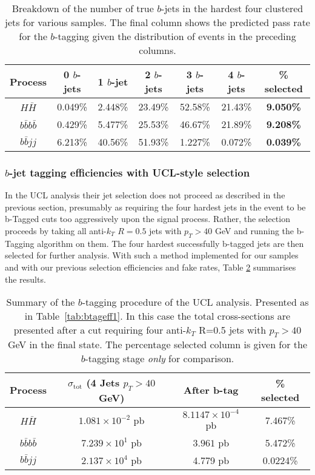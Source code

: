 \documentclass[12pt]{article}
\begin{document}
\begin{table}[htdp]
\begin{center}
\begin{tabular}{|c|c|c|c|c|c||c|}
\hline
Process & 0 $b$-jets & 1 $b$-jet & 2 $b$-jets & 3 $b$-jets & 4 $b$-jets & \% selected \\
\hline\hline
$H\bar{H}$ & 0.049\% &  2.448\% &  23.49\% & 52.58\% &  21.43\% & \textbf{9.050\%}\\
\hline
$b\bar{b}b\bar{b}$ & 0.429\% & 5.477\%   & 25.53\% & 46.67\%  &  21.89\% & \textbf{9.208\%} \\
$b\bar{b}jj$ & 6.213\%  &40.56\%  &51.93\%  &  1.227\% & 0.072\% & \textbf{0.039\%}\\
\hline
\end{tabular}
\end{center}
\caption{Breakdown of the number of true $b$-jets in the hardest four clustered jets for various samples. The final column shows the predicted pass rate for the $b$-tagging given the distribution of events in the preceding columns.}\label{tab:nbjets}
\end{table}%

\subsubsection{$b$-jet tagging efficiencies with UCL-style selection}
In the UCL analysis their jet selection does not proceed as described in the previous section, presumably as requiring the four hardest jets in the event to be b-Tagged cuts too aggressively upon the signal process. Rather, the selection proceeds by taking all anti-$k_T$ $R=0.5$ jets with $p_T > 40$ GeV and running the b-Tagging algorithm on them. The four hardest successfully b-tagged jets are then selected for further analysis. With such a method implemented for our samples and with our previous selection efficiencies and fake rates, Table \ref{tab:UCLbtag} summarises the results.

\begin{table}[h]
\begin{center}
\begin{tabular}{|c|c|c|c|}
\hline
Process & $\sigma_{\mathrm{tot}}$ (4 Jets $p_T>40$ GeV) & After b-tag & \% selected  \\
\hline \hline
$H\bar{H}$ & $1.081 \times 10^{-2}$ pb & $8.1147\times 10^{-4}$ pb & 7.467\% \\
\hline
$b\bar{b}b\bar{b}$ & $7.239 \times10^1$ pb & $3.961$ pb & 5.472\% \\
$b\bar{b}jj$ &  $2.137 \times 10^4$ pb & 4.779 pb & 0.0224\% \\
\hline
\end{tabular}
\end{center}
\caption{Summary of the $b$-tagging procedure of the UCL analysis. Presented as in Table~\ref{tab:btageff1}. In this case the total cross-sections are presented after a cut requiring four anti-$k_T$ R=0.5 jets with $p_T>40$ GeV in the final state. The percentage selected column is given for the $b$-tagging stage \emph{only} for comparison.}\label{tab:UCLbtag}
\end{table}%
\end{document}
